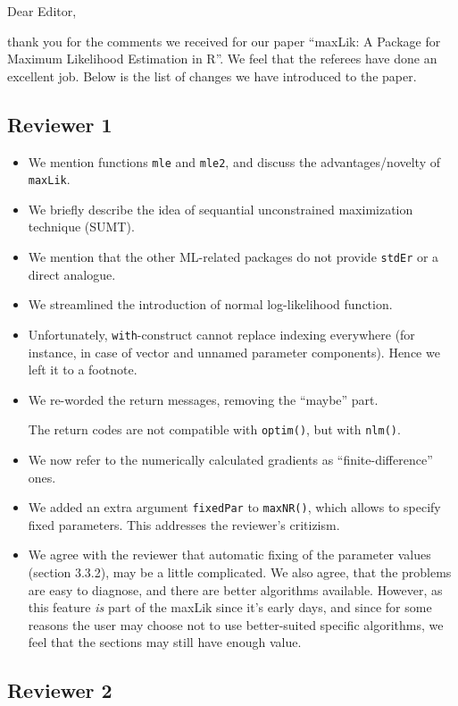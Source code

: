 \documentclass[a4paper]{article}
\begin{document}
Dear Editor,

thank you for the comments we received for our paper ``maxLik: A
Package for Maximum Likelihood Estimation in R''.  We feel that the
referees have done an excellent job.  Below is the list of changes we
have introduced to the paper.

\subsection*{Reviewer 1}

\begin{itemize}
\item We mention functions \texttt{mle} and \texttt{mle2}, and discuss
  the advantages/novelty of \texttt{maxLik}.
\item We briefly describe the idea of sequantial unconstrained
  maximization technique (SUMT).
\item We mention that the other ML-related packages do not provide
  \texttt{stdEr} or a direct analogue.
\item We streamlined the introduction of normal log-likelihood function.
\item Unfortunately, \texttt{with}-construct cannot replace indexing
  everywhere (for instance, in case of vector and unnamed
  parameter components).  Hence we left it to a footnote.
\item We re-worded the return messages, removing the ``maybe'' part.

  The return codes are not compatible with \texttt{optim()},
  but with \texttt{nlm()}.
\item We now refer to the numerically calculated gradients as
  ``finite-difference'' ones.
\item We added an extra argument \texttt{fixedPar} to
  \texttt{maxNR()}, which allows to specify fixed parameters.  This
  addresses the reviewer's critizism.
\item We agree with the reviewer that automatic fixing of the
  parameter values (section 3.3.2), may be a little complicated.  We
  also agree, that the problems are easy to diagnose, and there are
  better algorithms available.  However, as this feature \emph{is}
  part of the maxLik since it's early days, and since for some reasons
  the user may choose not to use better-suited specific algorithms, we
  feel that the sections may still have enough value.
\end{itemize}

\subsection*{Reviewer 2}
\end{document}
